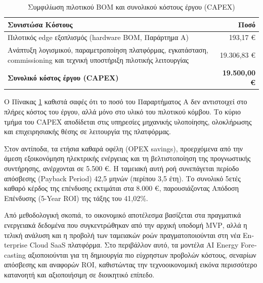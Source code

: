 \begin{table}[htbp]
\centering
\caption{Συμφιλίωση πιλοτικού \textlatin{BOM} και συνολικού κόστους έργου (\textlatin{CAPEX})}
\label{tab:capex_reconciliation}
\begin{tabular}{@{}p{9.2cm}r@{}}
\toprule
\textbf{Συνιστώσα Κόστους} & \textbf{Ποσό} \\
\midrule
Πιλοτικός \textlatin{edge} εξοπλισμός (\textlatin{hardware BOM}, Παράρτημα Α) & 193,17 \euro \\
Ανάπτυξη λογισμικού, παραμετροποίηση πλατφόρμας, εγκατάσταση, \textlatin{commissioning} και τεχνική υποστήριξη πιλοτικής λειτουργίας & 19.306,83 \euro \\
\midrule
\textbf{Συνολικό κόστος έργου (\textlatin{CAPEX})} & \textbf{19.500,00 \euro} \\
\bottomrule
\end{tabular}
\end{table}

Ο Πίνακας \ref{tab:capex_reconciliation} καθιστά σαφές ότι το ποσό του Παραρτήματος Α δεν αντιστοιχεί στο πλήρες κόστος του έργου, αλλά μόνο στο υλικό του πιλοτικού κόμβου. Το κύριο τμήμα του \textlatin{CAPEX} αποδίδεται στις υπηρεσίες μηχανικής υλοποίησης, ολοκλήρωσης και επιχειρησιακής θέσης σε λειτουργία της πλατφόρμας.

Στον αντίποδα, τα ετήσια καθαρά οφέλη (\textlatin{OPEX savings}), προερχόμενα από την άμεση εξοικονόμηση ηλεκτρικής ενέργειας και τη βελτιστοποίηση της προγνωστικής συντήρησης, ανέρχονται σε 5.500 \euro. Η ταμειακή αυτή ροή συνεπάγεται περίοδο απόσβεσης (\textlatin{Payback Period}) 42,5 μηνών (περίπου 3,5 έτη). Το συνολικό 5ετές καθαρό κέρδος της επένδυσης εκτιμάται στα 8.000 \euro, παρουσιάζοντας Απόδοση Επένδυσης (\textlatin{5-Year ROI}) της τάξης του 41,02\%.

Από μεθοδολογική σκοπιά, το οικονομικό αποτέλεσμα βασίζεται στα πραγματικά ενεργειακά δεδομένα που συγκεντρώθηκαν από την αρχική υποδομή \textlatin{MVP}, αλλά η τελική ανάλυση και η προβολή των ταμειακών ροών πραγματοποιούνται στη νέα \textlatin{Enterprise Cloud SaaS} πλατφόρμα. Στο περιβάλλον αυτό, τα μοντέλα \textlatin{AI Energy Forecasting} αξιοποιούνται για τη δημιουργία πιο εύχρηστων προβολών κόστους, σεναρίων απόσβεσης και αναφορών \textlatin{ROI}, καθιστώντας την τεχνοοικονομική εικόνα περισσότερο κατανοητή και αξιοποιήσιμη σε διοικητικό επίπεδο.

